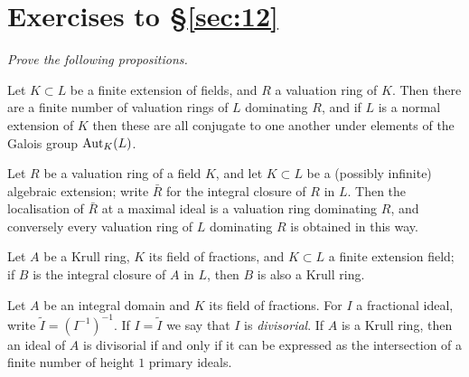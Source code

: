 \section*{Exercises to \S\ref{sec:12}}
\emph{Prove the following propositions.}

\begin{exercise}\label{ex:12.1-ex}
Let $K \subset L$ be a finite extension of fields, and $R$ a valuation ring of $K$. Then
there are a finite number of valuation rings of $L$ dominating $R$, and if $L$ is a
normal extension of $K$ then these are all conjugate to one another under
elements of the Galois group $\operatorname{Aut}_K(L)$.
\end{exercise}

\begin{exercise}\label{ex:12.2-ex}
Let $R$ be a valuation ring of a field $K$, and let $K \subset L$ be a (possibly infinite)
algebraic extension; write $\bar{R}$ for the integral closure of $R$ in $L$. Then the
localisation of $\bar{R}$ at a maximal ideal is a valuation ring dominating $R$, and
conversely every valuation ring of $L$ dominating $R$ is obtained in this way.
\end{exercise}

\begin{exercise}\label{ex:12.3-ex}
Let $A$ be a Krull ring, $K$ its field of fractions, and $K \subset L$ a finite extension
field; if $B$ is the integral closure of $A$ in $L$, then $B$ is also a Krull ring.
\end{exercise}

\begin{exercise}\label{ex:12.4-ex}
Let $A$ be an integral domain and $K$ its field of fractions. For $I$ a fractional
ideal, write $\tilde{I} = (I^{-1})^{-1}$. If $I = \tilde{I}$ we say that $I$ is \emph{divisorial}. If $A$ is a Krull
ring, then an ideal of $A$ is divisorial if and only if it can be expressed as the
intersection of a finite number of height $1$ primary ideals.
\end{exercise}
